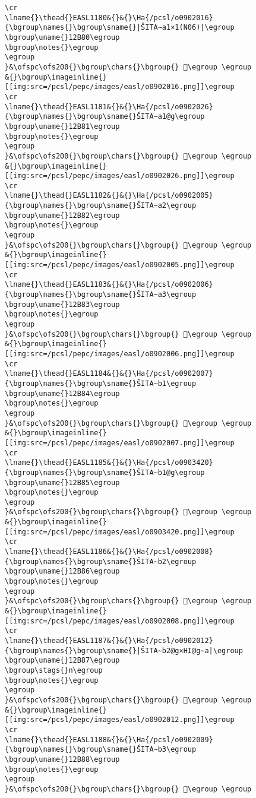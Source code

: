 \begin{verbatim}
\cr
\lname{}\thead{}EASL1180&{}&{}\Ha{/pcsl/o0902016}{\bgroup\names{}\bgroup\sname{}|ŠITA∼a1×1(N06)|\egroup
\bgroup\uname{}12B80\egroup
\bgroup\notes{}\egroup
\egroup
}&\ofspc\ofs200{}\bgroup\chars{}\bgroup{} 𒮀\egroup \egroup
&{}\bgroup\imageinline{}[[img:src=/pcsl/pepc/images/easl/o0902016.png]]\egroup
\cr
\lname{}\thead{}EASL1181&{}&{}\Ha{/pcsl/o0902026}{\bgroup\names{}\bgroup\sname{}ŠITA∼a1@g\egroup
\bgroup\uname{}12B81\egroup
\bgroup\notes{}\egroup
\egroup
}&\ofspc\ofs200{}\bgroup\chars{}\bgroup{} 𒮁\egroup \egroup
&{}\bgroup\imageinline{}[[img:src=/pcsl/pepc/images/easl/o0902026.png]]\egroup
\cr
\lname{}\thead{}EASL1182&{}&{}\Ha{/pcsl/o0902005}{\bgroup\names{}\bgroup\sname{}ŠITA∼a2\egroup
\bgroup\uname{}12B82\egroup
\bgroup\notes{}\egroup
\egroup
}&\ofspc\ofs200{}\bgroup\chars{}\bgroup{} 𒮂\egroup \egroup
&{}\bgroup\imageinline{}[[img:src=/pcsl/pepc/images/easl/o0902005.png]]\egroup
\cr
\lname{}\thead{}EASL1183&{}&{}\Ha{/pcsl/o0902006}{\bgroup\names{}\bgroup\sname{}ŠITA∼a3\egroup
\bgroup\uname{}12B83\egroup
\bgroup\notes{}\egroup
\egroup
}&\ofspc\ofs200{}\bgroup\chars{}\bgroup{} 𒮃\egroup \egroup
&{}\bgroup\imageinline{}[[img:src=/pcsl/pepc/images/easl/o0902006.png]]\egroup
\cr
\lname{}\thead{}EASL1184&{}&{}\Ha{/pcsl/o0902007}{\bgroup\names{}\bgroup\sname{}ŠITA∼b1\egroup
\bgroup\uname{}12B84\egroup
\bgroup\notes{}\egroup
\egroup
}&\ofspc\ofs200{}\bgroup\chars{}\bgroup{} 𒮄\egroup \egroup
&{}\bgroup\imageinline{}[[img:src=/pcsl/pepc/images/easl/o0902007.png]]\egroup
\cr
\lname{}\thead{}EASL1185&{}&{}\Ha{/pcsl/o0903420}{\bgroup\names{}\bgroup\sname{}ŠITA∼b1@g\egroup
\bgroup\uname{}12B85\egroup
\bgroup\notes{}\egroup
\egroup
}&\ofspc\ofs200{}\bgroup\chars{}\bgroup{} 𒮅\egroup \egroup
&{}\bgroup\imageinline{}[[img:src=/pcsl/pepc/images/easl/o0903420.png]]\egroup
\cr
\lname{}\thead{}EASL1186&{}&{}\Ha{/pcsl/o0902008}{\bgroup\names{}\bgroup\sname{}ŠITA∼b2\egroup
\bgroup\uname{}12B86\egroup
\bgroup\notes{}\egroup
\egroup
}&\ofspc\ofs200{}\bgroup\chars{}\bgroup{} 𒮆\egroup \egroup
&{}\bgroup\imageinline{}[[img:src=/pcsl/pepc/images/easl/o0902008.png]]\egroup
\cr
\lname{}\thead{}EASL1187&{}&{}\Ha{/pcsl/o0902012}{\bgroup\names{}\bgroup\sname{}|ŠITA∼b2@g×HI@g∼a|\egroup
\bgroup\uname{}12B87\egroup
\bgroup\stags{}n\egroup
\bgroup\notes{}\egroup
\egroup
}&\ofspc\ofs200{}\bgroup\chars{}\bgroup{} 𒮇\egroup \egroup
&{}\bgroup\imageinline{}[[img:src=/pcsl/pepc/images/easl/o0902012.png]]\egroup
\cr
\lname{}\thead{}EASL1188&{}&{}\Ha{/pcsl/o0902009}{\bgroup\names{}\bgroup\sname{}ŠITA∼b3\egroup
\bgroup\uname{}12B88\egroup
\bgroup\notes{}\egroup
\egroup
}&\ofspc\ofs200{}\bgroup\chars{}\bgroup{} 𒮈\egroup \egroup

\end{verbatim}
